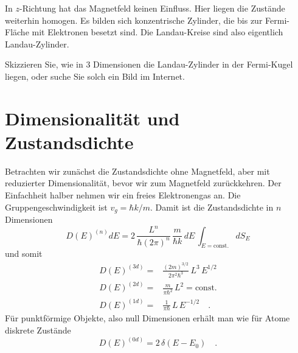 In $z$-Richtung hat das Magnetfeld keinen Einfluss. Hier liegen die Zustände weiterhin homogen. Es bilden sich  konzentrische Zylinder, die bis zur Fermi-Fläche mit Elektronen besetzt sind. Die Landau-Kreise sind also eigentlich Landau-Zylinder.


\begin{questions}
   \item Skizzieren Sie, wie in 3 Dimensionen die Landau-Zylinder in der Fermi-Kugel liegen, oder suche Sie solch ein Bild im Internet.
\end{questions}



\section{Dimensionalität und Zustandsdichte}


Betrachten wir zunächst die Zustandsdichte ohne Magnetfeld, aber mit reduzierter Dimensionalität, bevor wir zum Magnetfeld zurückkehren. Der Einfachheit halber nehmen wir ein freies Elektronengas an. Die Gruppengeschwindigkeit ist $v_g = \hbar k / m$. Damit ist die Zustandsdichte in $n$ Dimensionen
\begin{equation}
    D(E)^{(n)} dE = 2 \, \frac{L^n}{\hbar (2 \pi)^n} \, \frac{m}{\hbar k} \,  dE \, \int_{E = \text{const.}} d S_E 
\end{equation}
und somit
\begin{eqnarray}
   D(E)^{(3d)} = &  \frac{(2m)^{3/2}}{2 \pi^2 \hbar^3} \, L^3 \,  E^{1/2}  \\
   D(E)^{(2d)} = &  \frac{m}{\pi \hbar^2} \, L^2   = \text{const.} \\
   D(E)^{(1d)} = &  \frac{1}{\pi \hbar} \, L \, E^{-1/2}    \quad .
\end{eqnarray}
Für punktförmige Objekte, also null Dimensionen erhält man wie für Atome diskrete Zustände
\begin{equation}
   D(E)^{(0d)} =  2 \, \delta(E-E_0) \quad .
\end{equation}

